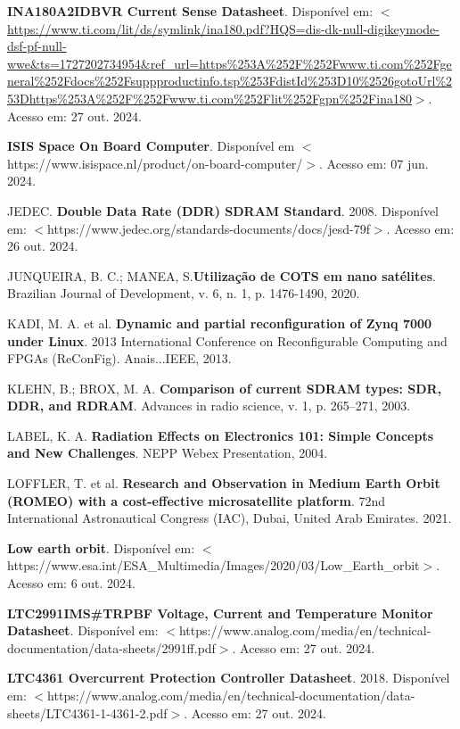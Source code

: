 \begin{flushleft}
\begin{thebibliography}{00}
 \textbf{INA180A2IDBVR Current Sense Datasheet}. Disponível em: $<$\url{https://www.ti.com/lit/ds/symlink/ina180.pdf?HQS=dis-dk-null-digikeymode-dsf-pf-null-wwe\&ts=1727202734954\&ref\_url=https\%253A\%252F\%252Fwww.ti.com\%252Fgeneral\%252Fdocs\%252Fsuppproductinfo.tsp\%253FdistId\%253D10\%2526gotoUrl\%253Dhttps\%253A\%252F\%252Fwww.ti.com\%252Flit\%252Fgpn\%252Fina180}$>$. Acesso em: 27 out. 2024. 

 \textbf{ISIS Space On Board Computer}. Disponível em $<$https://www.isispace.nl/product/on-board-computer/$>$. Acesso em: 07 jun. 2024.

 JEDEC. \textbf{Double Data Rate (DDR) SDRAM Standard}. 2008. Disponível em: $<$https://www.jedec.org/standards-documents/docs/jesd-79f$>$. Acesso em: 26 out. 2024.

 JUNQUEIRA, B. C.; MANEA, S.\textbf{Utilização de COTS em nano satélites}. Brazilian Journal of Development, v. 6, n. 1, p. 1476-1490, 2020.

 KADI, M. A. et al. \textbf{Dynamic and partial reconfiguration of Zynq 7000 under Linux}. 2013 International Conference on Reconfigurable Computing and FPGAs (ReConFig). Anais...IEEE, 2013.

 KLEHN, B.; BROX, M. A. \textbf{Comparison of current SDRAM types: SDR, DDR, and RDRAM}. Advances in radio science, v. 1, p. 265–271, 2003.

 LABEL, K. A. \textbf{Radiation Effects on Electronics 101: Simple Concepts and New Challenges}. NEPP Webex Presentation, 2004.

 LOFFLER, T. et al. \textbf{Research and Observation in Medium Earth Orbit (ROMEO) with a cost-effective microsatellite platform}. 72nd International Astronautical Congress (IAC), Dubai, United Arab Emirates. 2021. 

 \textbf{Low earth orbit}. Disponível em: $<$https://www.esa.int/ESA\_Multimedia/Images/2020/03/Low\_Earth\_orbit$>$. Acesso em: 6 out. 2024.

 \textbf{LTC2991IMS\#TRPBF Voltage, Current and Temperature Monitor Datasheet}. Disponível em: $<$https://www.analog.com/media/en/technical-documentation/data-sheets/2991ff.pdf$>$. Acesso em: 27 out. 2024. 

 \textbf{LTC4361 Overcurrent Protection Controller Datasheet}. 2018. Disponível em: $<$https://www.analog.com/media/en/technical-documentation/data-sheets/LTC4361-1-4361-2.pdf$>$. Acesso em: 27 out. 2024. 


\end{thebibliography}
\end{flushleft}
